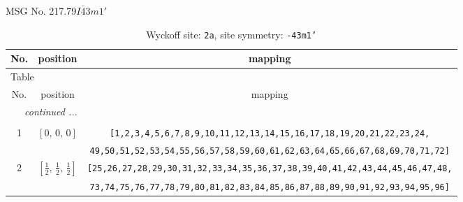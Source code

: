 \documentclass[fleqn,8pt]{jsarticle}
\begin{document}
\setcounter{MaxMatrixCols}{32}

\renewcommand{\tablename}{Table~}
\renewcommand{\figurename}{Figure~}
\begin{center}
\LARGE
MSG No. 217.79\quad$I\bar{4}3m1'$
\end{center}
\renewcommand{\arraystretch}{1.2}
\begin{longtable}{ccc}
\caption{Wyckoff site: {\tt 2a}, site symmetry: {\tt -43m1'}}
 \\
 \hline \hline
No. & position & mapping \\ \hline \endfirsthead

\multicolumn{2}{l}{\tablename\ \thetable{}} \\
 \hline \hline
No. & position & mapping \\ \hline \endhead

 \hline \hline
\multicolumn{2}{r}{\footnotesize\it continued ...} \\ \endfoot

 \hline \hline
\multicolumn{2}{r}{} \\ \endlastfoot

1 & $\left[ 0,\, 0,\, 0 \right]$ & {\tt [1,2,3,4,5,6,7,8,9,10,11,12,13,14,15,16,17,18,19,20,21,22,23,24,} \\ \hline
 &  & {\tt 49,50,51,52,53,54,55,56,57,58,59,60,61,62,63,64,65,66,67,68,69,70,71,72]} \\ \hline
2 & $\left[ \frac{1}{2},\, \frac{1}{2},\, \frac{1}{2} \right]$ & {\tt [25,26,27,28,29,30,31,32,33,34,35,36,37,38,39,40,41,42,43,44,45,46,47,48,} \\ \hline
 &  & {\tt 73,74,75,76,77,78,79,80,81,82,83,84,85,86,87,88,89,90,91,92,93,94,95,96]} \\
\end{longtable}
\renewcommand{\arraystretch}{1.2}
\end{document}
